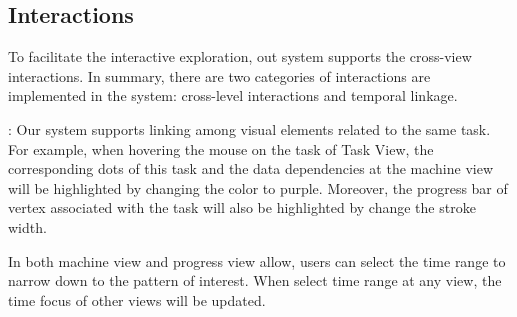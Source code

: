 \subsection{Interactions}
To facilitate the interactive exploration, out system supports the cross-view interactions. 
In summary, there are two categories of interactions are implemented in the system: cross-level interactions and temporal linkage.

:
Our system supports linking among visual elements related to the same task. 
For example, when hovering the mouse on the task of Task View, the corresponding dots of this task and the data dependencies at the machine view will be highlighted by changing the color to purple. Moreover, the progress bar of vertex associated with the task will also be highlighted by change the stroke width.   

In both machine view and progress view allow, users can select the time range to narrow down to the pattern of interest. When select time range at any view, the time focus of other views will be updated. 
